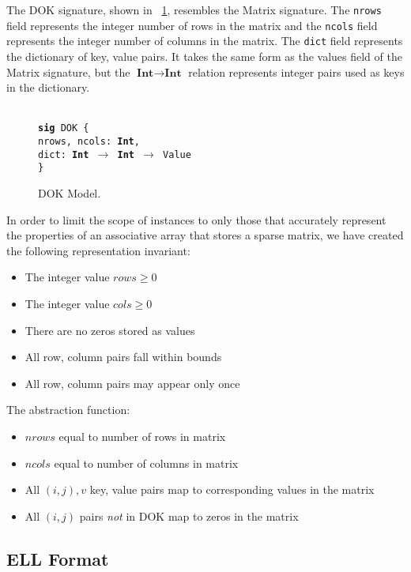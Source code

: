 \documentclass[11pt,conference]{IEEEtran}
\newenvironment{myquote}{\list{}{\leftmargin=12pt\rightmargin=0pt}\item[]}{\endlist}
\def\TA{\makebox[12pt]{}}
\def\Bsig{\textbf{sig} }
\def\Bint{\textbf{Int}}
\begin{document}
The DOK signature, shown in \figurename~\ref{model:dok}, resembles the Matrix signature.  The \texttt{nrows} field represents the integer number of rows in the matrix and the \texttt{ncols} field represents the integer number of columns in the matrix.  The \texttt{dict} field represents the dictionary of key, value pairs.  It takes the same form as the values field of the Matrix signature, but the \(\Bint \to \Bint\) relation represents integer pairs used as keys in the dictionary.

\begin{figure}
\centering
\begin{myquote}\small{\texttt{\\
\Bsig DOK \{\\
\TA nrows, ncols: \Bint,\\
\TA dict: \Bint~$\rightarrow$~\Bint~$\rightarrow$~Value\\
\}
}}
\end{myquote}
\caption{DOK Model.}
\label{model:dok}
\end{figure}

In order to limit the scope of instances to only those that accurately represent the properties of an associative array that stores a sparse matrix, we have created the following representation invariant:

\begin{itemize}
  \item The integer value \(rows \geq 0\)
  \item The integer value \(cols \geq 0\)
  \item There are no zeros stored as values
  \item All row, column pairs fall within bounds
  \item All row, column pairs may appear only once
\end{itemize}

The abstraction function:

\begin{itemize}
  \item \(nrows\) equal to number of rows in matrix
  \item \(ncols\) equal to number of columns in matrix
  \item All \((i, j), v\) key, value pairs map to corresponding values in the matrix
  \item All \((i, j)\) pairs \emph{not} in DOK map to zeros in the matrix
\end{itemize}

\subsection{ELL Format}
\end{document}
